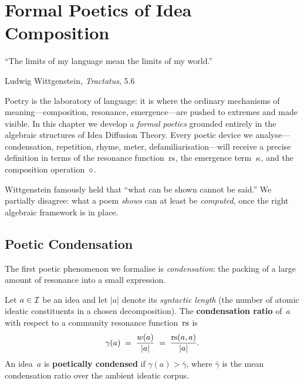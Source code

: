 

\chapter{Formal Poetics of Idea Composition}
\label{ch:poetics}

\epigraph{``The limits of my language mean the limits of my world.''}{Ludwig Wittgenstein, \textit{Tractatus}, 5.6}

Poetry is the laboratory of language: it is where the ordinary
mechanisms of meaning---composition, resonance, emergence---are
pushed to extremes and made visible.  In this chapter we develop a
\emph{formal poetics} grounded entirely in the algebraic structures
of Idea Diffusion Theory.  Every poetic device we analyse---condensation,
repetition, rhyme, meter, defamiliarisation---will receive a precise
definition in terms of the resonance function~$\mathrm{rs}$, the emergence
term~$\kappa$, and the composition operation~$\circ$.

Wittgenstein famously held that ``what can be shown cannot be said.''
We partially disagree: what a poem \emph{shows} can at least be
\emph{computed}, once the right algebraic framework is in place.

\section{Poetic Condensation}
\label{sec:condensation}

The first poetic phenomenon we formalise is \emph{condensation}:
the packing of a large amount of resonance into a small expression.

\begin{definition}
\label{def:condensation}
Let $a \in \mathcal{I}$ be an idea and let $|a|$ denote its \emph{syntactic
length} (the number of atomic ideatic constituents in a chosen
decomposition).  The \textbf{condensation ratio} of~$a$ with respect
to a community resonance function~$\mathrm{rs}$ is
\[
  \gamma(a) \;=\; \frac{w(a)}{|a|}
  \;=\; \frac{\mathrm{rs}(a,a)}{|a|}.
\]
An idea~$a$ is \textbf{poetically condensed} if $\gamma(a) >
\bar{\gamma}$, where $\bar{\gamma}$ is the mean condensation ratio
over the ambient ideatic corpus.
\end{definition}

